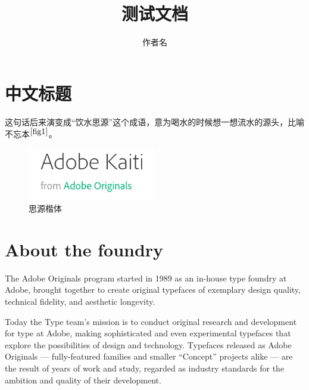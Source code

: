 \documentclass[14pt, a4paper]{article}
\begin{document}
\title{\textbf{测试文档}}
\author{作者名}
\maketitle
\begin{multicols}{2}
    \tableofcontents
\end{multicols}
\newpage
\twocolumn
\section{中文标题}
    这句话后来演变成“饮水思源”这个成语，意为喝水的时候想一想流水的源头，比喻不忘本$^{\ref{fig1}}$。
    \begin{figure}[htbp]
        \centering
        \includegraphics[width = 2.2in]{fig/Adobe_Kaiti.png}
        \caption{思源楷体}
        \label{fig1}
    \end{figure}
\section{About the foundry}
    The Adobe Originals program started in 1989 as an in-house type foundry at Adobe, brought together to create original typefaces of exemplary design quality, technical fidelity, and aesthetic longevity.
    
    Today the Type team’s mission is to conduct original research and development for type at Adobe, making sophisticated and even experimental typefaces that explore the possibilities of design and technology. Typefaces released as Adobe Originals — fully-featured families and smaller “Concept” projects alike — are the result of years of work and study, regarded as industry standards for the ambition and quality of their development.
\end{document}
